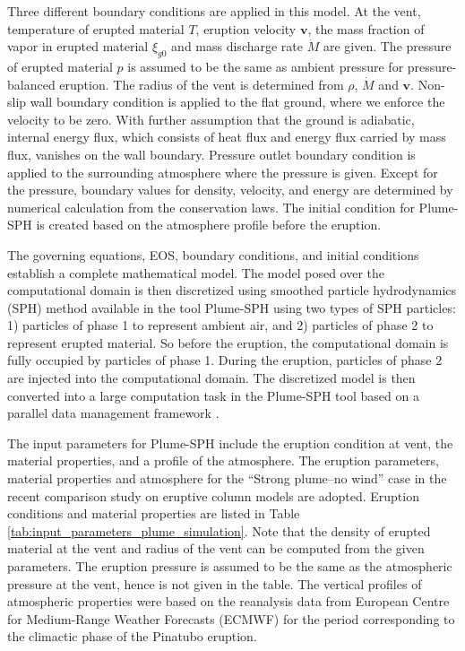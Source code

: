\documentclass[utf8]{frontiersSCNS} %
\begin{document}
Three different boundary conditions are applied in this model. At the vent, temperature of erupted material $T$, eruption velocity $\textbf{v}$, the mass fraction of vapor in erupted material $\xi_{g0}$ and mass discharge rate $\dot M$ are given. The pressure of erupted material $p$ is assumed to be the same as ambient pressure for pressure-balanced eruption. The radius of the vent is determined from $\rho$, $\dot M$ and $\textbf{v}$.  Non-slip wall boundary condition is applied to the flat ground, where we enforce the velocity to be zero. With further assumption that the ground is adiabatic, internal energy flux, which consists of heat flux and energy flux carried by mass flux, vanishes on the wall boundary. Pressure outlet boundary condition is applied to the surrounding atmosphere where the pressure is given. Except for the pressure,  boundary values for density, velocity, and energy are determined by numerical calculation from the conservation laws. The initial condition for Plume-SPH is created based on the atmosphere profile before the eruption. 

The governing equations,  EOS, boundary conditions, and initial conditions establish a complete mathematical model. The model posed over the computational domain is then discretized using smoothed particle hydrodynamics (SPH) method \citep{gingold1977smoothed} available in the tool  Plume-SPH \citep{cao2017data, cao2018plume} using two types of SPH particles: 1) particles of phase 1 to represent ambient air, and 2) particles of phase 2 to represent erupted material. So before the eruption, the computational domain is fully occupied by particles of phase 1. During the eruption, particles of phase 2 are injected into the computational domain. The discretized model is then converted into a large computation  task in the Plume-SPH tool based on a parallel data management framework \citep{cao2017data}.

The input parameters for Plume-SPH include the eruption condition at vent, the material properties, and a profile of the atmosphere. The eruption parameters, material properties and atmosphere for the ``Strong plume--no wind'' case in the recent comparison study on eruptive column models \citep {costa2016results} are adopted. Eruption conditions and material properties are listed in Table \ref{tab:input_parameters_plume_simulation}. Note that the density of erupted material at the vent and radius of the vent can be computed from the given parameters. The eruption pressure is assumed to be the same as the atmospheric pressure at the vent, hence is not given in the table. The vertical profiles of atmospheric properties were  based on the reanalysis data from European Centre for Medium-Range Weather Forecasts (ECMWF) for the period corresponding to the climactic phase of the Pinatubo eruption. 
\end{document}
